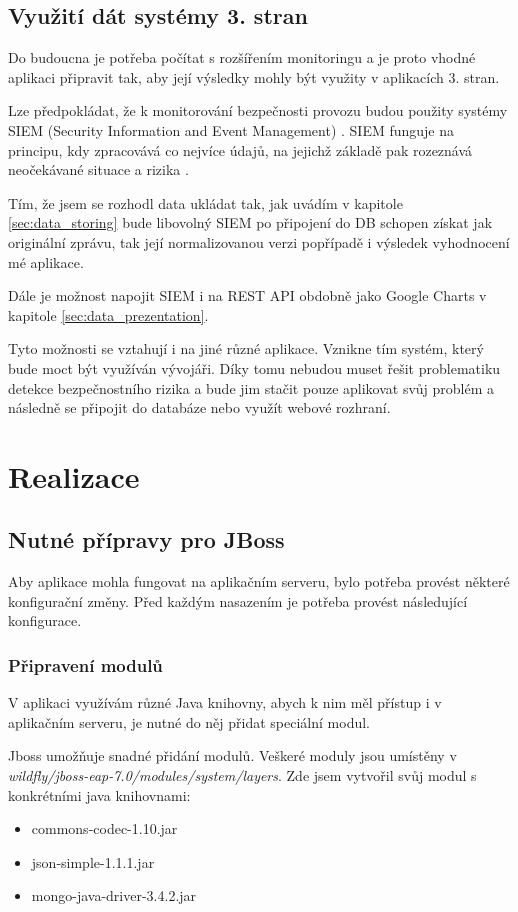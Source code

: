 \documentclass[thesis=M,czech]{FITthesis}[2012/10/20]
\begin{document}
	\section{Využití dát systémy 3. stran}
		Do budoucna je potřeba počítat s rozšířením monitoringu a je proto vhodné aplikaci připravit tak, aby její výsledky mohly být využity v aplikacích 3. stran.
		
		Lze předpokládat, že k monitorování bezpečnosti provozu budou použity systémy SIEM (Security Information and Event Management) \cite{siem}.
		SIEM funguje na principu, kdy zpracovává co nejvíce údajů, na jejichž základě pak rozeznává neočekávané situace a rizika \cite{howDesSiemWork}.
		
		Tím, že jsem se rozhodl data ukládat tak, jak uvádím v kapitole \ref{sec:data_storing} bude libovolný SIEM po připojení do DB schopen získat jak originální zprávu, tak její normalizovanou verzi popřípadě i výsledek vyhodnocení mé aplikace.
		
		Dále je možnost napojit SIEM i na REST API obdobně jako Google Charts v kapitole \ref{sec:data_prezentation}.
		
		Tyto možnosti se vztahují i na jiné různé aplikace. Vznikne tím systém, který bude moct být využíván vývojáři. Díky tomu nebudou muset řešit problematiku detekce bezpečnostního rizika a bude jim stačit pouze aplikovat svůj problém a následně se připojit do databáze nebo využít webové rozhraní. 
		
\chapter{Realizace}
	
	\section{Nutné přípravy pro JBoss}
		Aby aplikace mohla fungovat na aplikačním serveru, bylo potřeba provést některé konfigurační změny. Před každým nasazením je potřeba provést následující konfigurace.
		
		\subsection{Připravení modulů}
		V aplikaci využívám různé Java knihovny, abych k nim měl přístup i v aplikačním serveru, je nutné do něj přidat speciální modul.
		
		Jboss umožňuje snadné přidání modulů. Veškeré moduly jsou umístěny v \textit{wildfly/jboss-eap-7.0/modules/system/layers}. Zde jsem vytvořil svůj modul s konkrétními java knihovnami:
		\begin{itemize} 
			\item commons-codec-1.10.jar
			\item json-simple-1.1.1.jar
			\item mongo-java-driver-3.4.2.jar		
		\end{itemize}
	
\end{document}
